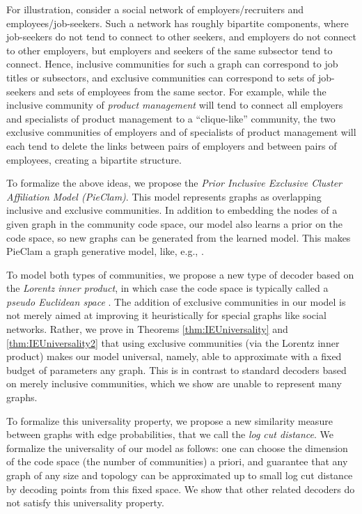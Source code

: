 \documentclass{article}
\theoremstyle{plain}
\theoremstyle{definition}
\theoremstyle{remark}
\begin{document}
For illustration, consider a social network of employers/recruiters and employees/job-seekers. Such a network has roughly bipartite components, where job-seekers do not tend to connect to other seekers, and employers do not connect to other employers, but employers and seekers of the same subsector tend to connect. Hence, inclusive communities for such a graph can correspond to job titles or subsectors, and exclusive communities can correspond to sets of job-seekers and sets of employees from the same sector. For example, while the inclusive community of \emph{product management} will tend to connect all employers and specialists of product management to a ``clique-like'' community, the two exclusive communities of employers and of specialists of product management will each tend to delete the links between pairs of employers and between pairs of employees, creating a bipartite structure.

To formalize the above ideas, we propose the \emph{Prior Inclusive Exclusive Cluster Affiliation Model (PieClam)}. This model represents graphs as overlapping inclusive and exclusive communities. In addition to embedding the nodes of a given graph in the community code space, our model also learns a prior on the code space, so new graphs can be generated from the learned model. This makes PieClam a graph generative model, like, e.g.,  \cite{kipf2016variational,grover2019graphite,JMLR:v21:19-671,mehta2019stochastic,sun2019vgraph}. 

To model both types of communities, we propose a new type of decoder based on the \emph{Lorentz inner product}, in which case the code space is typically called a \emph{pseudo Euclidean space} \cite{greub1963pseudo}. The addition of exclusive communities in our model is not merely aimed at improving it heuristically for special graphs like social networks. Rather, we prove in Theorems \ref{thm:IEUniversality} and \ref{thm:IEUniversality2} that using exclusive communities (via the Lorentz inner product) makes our model universal, namely, able to approximate with a fixed budget of parameters any graph. This is in contrast to standard decoders based on merely inclusive communities, which we show are unable to represent many graphs. %

To formalize this universality property, we propose a new similarity measure between graphs with edge probabilities, that we call the \emph{log cut distance}. We formalize the universality of our model as follows: one can choose the dimension of the code space (the number of communities)  a priori, and guarantee that any graph of any size and topology can be approximated up to small log cut distance by decoding points from this fixed space. We show that other related decoders do not satisfy this universality property. 
\end{document}
